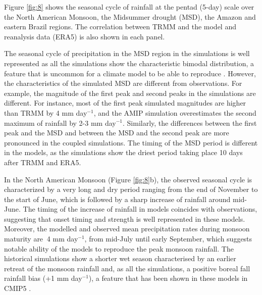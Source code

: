 Figure \ref{fig:8} shows the seasonal cycle of rainfall at the pentad (5-day) scale over the North American Monsoon, the  Midsummer drought (MSD), the Amazon and eastern Brazil regions. The correlation between TRMM and the model and reanalysis data (ERA5) is also shown in each panel. 


The seasonal cycle of precipitation in the MSD region in the simulations is well represented as all the simulations show the characteristic bimodal distribution, a feature that is uncommon for a climate model to be able to reproduce \citep{ryu2014}.
However, the characteristics of the simulated MSD are different from observations.
For example, the magnitude of the first peak and second peaks in the simulations are different. 
For instance, most of the first peak simulated magnitudes are higher than TRMM by 4 mm day$^{-1}$, and the AMIP simulation overestimates the second maximum of rainfall by 2-3 mm day$^{-1}$. Similarly, the differences between the first peak and the MSD and between the MSD and the second peak are more pronounced in the coupled simulations. The timing of the MSD period is different in the models, as the simulations show the driest period taking place 10 days after TRMM and ERA5. %
 
 

In the North American Monsoon (Figure \ref{fig:8}b), the observed seasonal cycle is characterized by a very long and dry period ranging from the end of November to the start of June, which is followed by a sharp increase of rainfall around mid-June. The timing of the increase of rainfall in models coincides with observations, suggesting that onset timing and strength is well represented in these models.
Moreover, the modelled and observed mean precipitation rates during monsoon maturity are $~$4 mm day$^{-1}$, from mid-July until early September, which suggests notable ability of the models to reproduce the peak monsoon rainfall.
   The historical simulations show a shorter wet season characterised by an earlier retreat of the monsoon rainfall and, as all the simulations, a positive boreal fall rainfall bias (+1 mm day$^{-1}$), a feature that has been shown in these models in CMIP5 \citep{geil2013}. %


